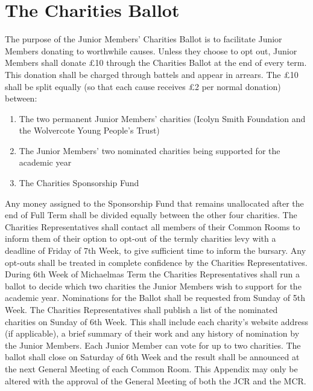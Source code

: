 \chapter{The Charities Ballot} \label{app:charities_ballot}

\appnpara The purpose of the Junior Members’ Charities Ballot is to facilitate Junior Members donating to worthwhile causes.
\appnpara Unless they choose to opt out, Junior Members shall donate £10 through the Charities Ballot at the end of every term.  This donation shall be charged through battels and appear in arrears.
\appnpara The £10 shall be split equally (so that each cause receives £2 per normal donation) between:
\begin{enumerate}
\item The two permanent Junior Members' charities (Icolyn Smith Foundation and the Wolvercote Young People's Trust)
\item The Junior Members' two nominated charities being supported for the academic year
\item The Charities Sponsorship Fund
\end{enumerate}
\appnpara Any money assigned to the Sponsorship Fund that remains unallocated after the end of Full Term shall be divided equally between the other four charities.
\appnpara The Charities Representatives shall contact all members of their Common Rooms to inform them of their option to opt-out of the termly charities levy with a deadline of Friday of 7th Week, to give sufficient time to inform the bursary. Any opt-outs shall be treated in complete confidence by the Charities Representatives.
\appnpara During 6th Week of Michaelmas Term the Charities Representatives shall run a ballot to decide which two charities the Junior Members wish to support for the academic year. Nominations for the Ballot shall be requested from Sunday of 5th Week. The Charities Representatives shall publish a list of the nominated charities on Sunday of 6th Week. This shall include each charity’s website address (if applicable), a brief summary of their work and any history of nomination by the Junior Members. Each Junior Member can vote for up to two charities. The ballot shall close on Saturday of 6th Week and the result shall be announced at the next General Meeting of each Common Room.
\appnpara This Appendix may only be altered with the approval of the General Meeting of both the JCR and the MCR.
